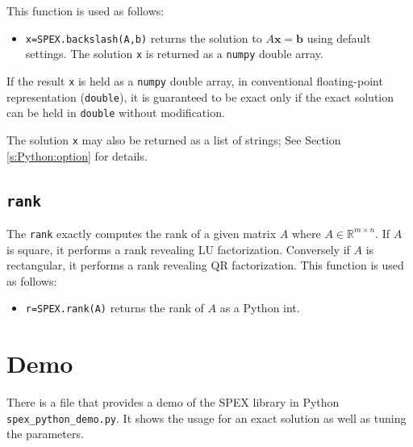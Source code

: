 \documentclass[12pt,oneside]{book}
\theoremstyle{definition}
\renewcommand{\b}{\mathbf{b}}
\newcommand{\x}{\mathbf{x}}
\begin{document}
This function is used as follows:

\begin{itemize}
    \item \verb|x=SPEX.backslash(A,b)| returns the solution to $A \x = \b$ using default settings. The solution \verb|x| is returned as a \verb|numpy| double array.
\end{itemize}

If the result \verb|x| is held as a \verb|numpy| double array, in conventional floating-point representation (\verb|double|), it is guaranteed to be exact only if the exact solution can be held in \verb|double| without modification.

The solution \verb|x| may also be returned as a list of strings; See Section \ref{s:Python:option} for details.


\subsection{\texttt{rank}}
The \verb|rank| exactly computes the rank of a given matrix $A$ where $A \in \mathbb{R}^{m \times n}$. If $A$ is square, it performs a rank revealing LU factorization. Conversely if $A$ is rectangular, it performs a rank revealing QR factorization. This function is used as follows:

\begin{itemize}
    \item \verb|r=SPEX.rank(A)| returns the rank of $A$ as a Python int.
\end{itemize}

\section{Demo}
There is a file that provides a demo of the SPEX library in Python \verb|spex_python_demo.py|. It shows the usage for an exact
solution as well as tuning the parameters.








\end{document}
